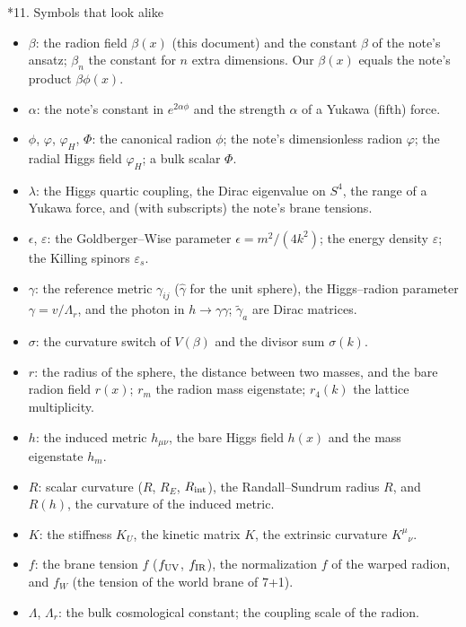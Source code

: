\documentclass[10pt,a4paper]{article}
\makeatletter
\renewcommand\section{\@startsection{section}{1}{\z@}{-3.5ex \@plus -1ex \@minus -.2ex}{2.3ex \@plus.2ex}{\normalfont\Large\bfseries\raggedright}}
\makeatother
\begin{document}
\section*{11. Symbols that look alike}
\begin{itemize}
\item $\beta$: the radion field $\beta(x)$ (this document) and the constant $\beta$ of the note’s ansatz; $\beta_n$ the constant for $n$ extra dimensions. Our $\beta(x)$ equals the note’s product $\beta\phi(x)$.
\item $\alpha$: the note’s constant in $e^{2\alpha\phi}$ and the strength $\alpha$ of a Yukawa (fifth) force.
\item $\phi$, $\varphi$, $\varphi_H$, $\Phi$: the canonical radion $\phi$; the note’s dimensionless radion $\varphi$; the radial Higgs field $\varphi_H$; a bulk scalar $\Phi$.
\item $\lambda$: the Higgs quartic coupling, the Dirac eigenvalue on $S^4$, the range of a Yukawa force, and (with subscripts) the note’s brane tensions.
\item $\epsilon$, $\varepsilon$: the Goldberger–Wise parameter $\epsilon=m^2/(4k^2)$; the energy density $\varepsilon$; the Killing spinors $\varepsilon_s$.
\item $\gamma$: the reference metric $\gamma_{ij}$ ($\hat\gamma$ for the unit sphere), the Higgs–radion parameter $\gamma=v/\Lambda_r$, and the photon in $h\to\gamma\gamma$; $\tilde\gamma_a$ are Dirac matrices.
\item $\sigma$: the curvature switch of $V(\beta)$ and the divisor sum $\sigma(k)$.
\item $r$: the radius of the sphere, the distance between two masses, and the bare radion field $r(x)$; $r_m$ the radion mass eigenstate; $r_4(k)$ the lattice multiplicity.
\item $h$: the induced metric $h_{\mu\nu}$, the bare Higgs field $h(x)$ and the mass eigenstate $h_m$.
\item $R$: scalar curvature ($R$, $R_E$, $R_{\rm int}$), the Randall–Sundrum radius $R$, and $R(h)$, the curvature of the induced metric.
\item $K$: the stiffness $K_U$, the kinetic matrix $K$, the extrinsic curvature $K^\mu{}_\nu$.
\item $f$: the brane tension $f$ ($f_{\rm UV}$, $f_{\rm IR}$), the normalization $f$ of the warped radion, and $f_W$ (the tension of the world brane of 7+1).
\item $\Lambda$, $\Lambda_r$: the bulk cosmological constant; the coupling scale of the radion.

\end{itemize}
\end{document}
